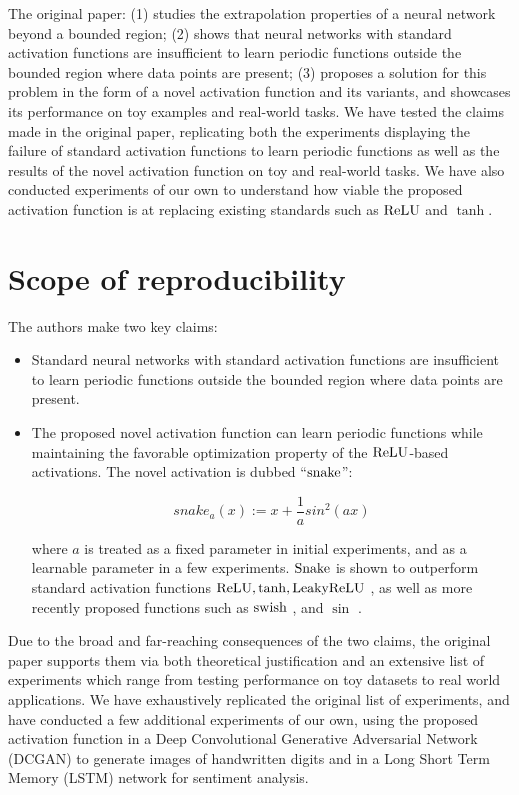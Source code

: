 The original paper: (1) studies the extrapolation properties of a neural network beyond a bounded region; (2) shows that neural networks with standard activation functions are insufficient to learn periodic functions outside the bounded region where data points are present; (3) proposes a solution for this problem in the form of a novel activation function and its variants, and showcases its performance on toy examples and real-world tasks. We have tested the claims made in the original paper, replicating both the experiments displaying the failure of standard activation functions to learn periodic functions as well as the results of the novel activation function on toy and real-world tasks. We have also conducted experiments of our own to understand how viable the proposed activation function is at replacing existing standards such as $\operatorname{ReLU}$ and $\tanh$. 

\section{Scope of reproducibility}

The authors make two key claims:
\begin{itemize}[leftmargin=*]
    \item Standard neural networks with standard activation functions are insufficient to learn periodic functions outside the bounded region where data points are present.
    \item The proposed novel activation function can learn periodic functions while maintaining the favorable optimization property of the $ \operatorname{ReLU} $-based activations. The novel activation is dubbed ``$ \operatorname{snake} $'':

     \[ snake_{a}(x) := x + \frac{1}{a}sin^{2}(a x) \]
     
     where $a$ is treated as a fixed parameter in initial experiments, and as a learnable parameter in a few experiments. $ \operatorname{Snake} $ is shown to outperform standard activation functions $ \operatorname{ReLU}, \tanh, \operatorname{LeakyReLU} $ \cite{DBLP:conf/icml/NairH10}, as well as more recently proposed functions such as $ \operatorname{swish} $ \cite{Ramachandran2017SwishAS}, and $ \sin $ \cite{sitzmann2020implicit, Parascandolo2017TamingTW}.
\end{itemize}

Due to the broad and far-reaching consequences of the two claims, the original paper supports them via both theoretical justification and an extensive list of experiments which range from testing performance on toy datasets to real world applications. We have exhaustively replicated the original list of experiments, and have conducted a few additional experiments of our own, using the proposed activation function in a Deep Convolutional Generative Adversarial Network (DCGAN) to generate images of handwritten digits and in a Long Short Term Memory (LSTM) network for sentiment analysis.


